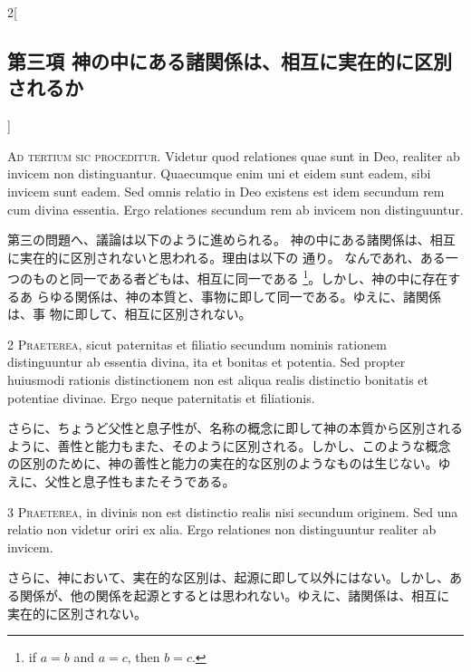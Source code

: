 \documentclass[paper=a4paper,fontsize=10pt,jafontsize=9pt,titlepage]{jlreq}
\begin{document}


\begin{paracol}{2}[\subsection{第三項 神の中にある諸関係は、相互に実在的に区別されるか}]

{\Huge A}{\scshape d tertium sic proceditur}. Videtur quod relationes quae sunt in Deo,
realiter ab invicem non distinguantur. Quaecumque enim uni et eidem sunt
eadem, sibi invicem sunt eadem. Sed omnis relatio in Deo existens est
idem secundum rem cum divina essentia. Ergo relationes secundum rem ab
invicem non distinguuntur.


\switchcolumn


第三の問題へ、議論は以下のように進められる。
神の中にある諸関係は、相互に実在的に区別されないと思われる。理由は以下の
 通り。
なんであれ、ある一つのものと同一である者どもは、相互に同一である
 \footnote{if $a=b$ and $a=c$, then $b=c$.}。しかし、神の中に存在するあ
 らゆる関係は、神の本質と、事物に即して同一である。ゆえに、諸関係は、事
 物に即して、相互に区別されない。


\switchcolumn*


2 {\scshape Praeterea}, sicut paternitas et filiatio secundum nominis rationem
distinguuntur ab essentia divina, ita et bonitas et potentia. Sed
propter huiusmodi rationis distinctionem non est aliqua realis
distinctio bonitatis et potentiae divinae. Ergo neque paternitatis et
filiationis.


\switchcolumn


さらに、ちょうど父性と息子性が、名称の概念に即して神の本質から区別される
 ように、善性と能力もまた、そのように区別される。しかし、このような概念
 の区別のために、神の善性と能力の実在的な区別のようなものは生じない。ゆ
 えに、父性と息子性もまたそうである。


\switchcolumn*


3 {\scshape Praeterea}, in divinis non est distinctio realis nisi secundum
originem. Sed una relatio non videtur oriri ex alia. Ergo relationes non
distinguuntur realiter ab invicem.


\switchcolumn


さらに、神において、実在的な区別は、起源に即して以外にはない。しかし、あ
 る関係が、他の関係を起源とするとは思われない。ゆえに、諸関係は、相互に
 実在的に区別されない。


\switchcolumn*[\subsection{s.c.}]



\end{paracol}
\end{document}
